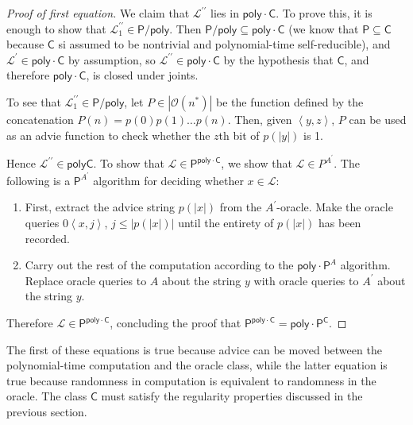 \documentclass[12pt]{amsart}
\theoremstyle{definition}
\theoremstyle{remark}
\newcommand{\cL}{\mathcal{L}}
\newcommand{\sC}{\mathsf{C}}
\newcommand{\sP}{\mathsf{P}}
\newcommand{\poly}{\mathsf{poly}}
\newcommand{\Oh}{\mathcal{O}}
\newcommand{\inner}[1]{\left\langle#1\right\rangle}
\begin{document}
\begin{proof}[Proof of first equation]
We claim that $\cL^{\prime\prime}$ lies in $\poly\cdot\sC$. To prove this, it is
enough to show that $\cL_1^{\prime\prime}\in\sP/\poly$. Then
$\sP/\poly\subseteq\poly\cdot\sC$ (we know that $\sP\subseteq\sC$ because $\sC$
si assumed to be nontrivial and polynomial-time self-reducible), and
$\cL^\prime\in\poly\cdot\sC$ by assumption, so
$\cL^{\prime\prime}\in\poly\cdot\sC$ by the hypothesis that $\sC$, and therefore
$\poly\cdot\sC$, is closed under joints.

To see that $\cL_1^{\prime\prime}\in\sP/\poly$, let $P\in|\Oh(n^*)|$ be the
function defined by the concatenation $P(n)=p(0)p(1)\ldots p(n)$. Then, given
$\inner{y,z}$, $P$ can be used as an advie function to check whether the $z$th
bit of $p(|y|)$ is 1.

Hence $\cL^{\prime\prime}\in\poly\sC$. To show that $\cL\in\sP^{\poly\cdot\sC}$,
we show that $\cL\in P^{A^\prime}$. The following is a $\sP^{A^\prime}$
algorithm for deciding whether $x\in\cL$:
\begin{enumerate}
\item First, extract the advice string $p(|x|)$ from the $A^\prime$-oracle. Make
  the oracle queries $0\inner{x,j}$, $j\leq|p(|x|)|$ until the entirety of
  $p(|x|)$ has been recorded.
\item Carry out the rest of the computation according to the $\poly\cdot\sP^A$
  algorithm. Replace oracle queries to $A$ about the string $y$ with oracle
  queries to $A^\prime$ about the string $y$.
\end{enumerate}
Therefore $\cL\in\sP^{\poly\cdot\sC}$, concluding the proof that $\sP^{\poly\cdot\sC}=\poly\cdot\sP^\sC$.
\end{proof}

The first of these equations is true because advice can be moved between the
polynomial-time computation and the oracle class, while the latter equation is
true because randomness in computation is equivalent to randomness in the
oracle. The class $\sC$ must satisfy the regularity properties discussed in the
previous section.
\end{document}
